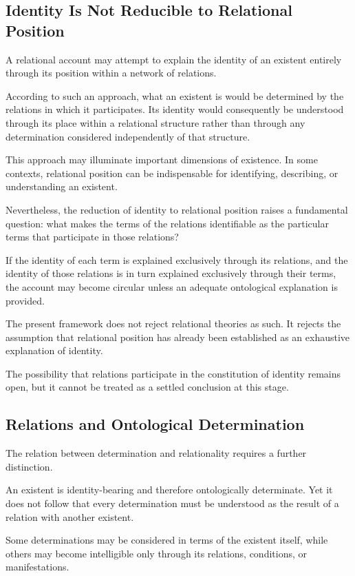 \subsection{Identity Is Not Reducible to Relational Position}

A relational account may attempt to explain the identity of an existent entirely through its position within a network of relations.

According to such an approach, what an existent is would be determined by the relations in which it participates. Its identity would consequently be understood through its place within a relational structure rather than through any determination considered independently of that structure.

This approach may illuminate important dimensions of existence. In some contexts, relational position can be indispensable for identifying, describing, or understanding an existent.

Nevertheless, the reduction of identity to relational position raises a fundamental question: what makes the terms of the relations identifiable as the particular terms that participate in those relations?

If the identity of each term is explained exclusively through its relations, and the identity of those relations is in turn explained exclusively through their terms, the account may become circular unless an adequate ontological explanation is provided.

The present framework does not reject relational theories as such. It rejects the assumption that relational position has already been established as an exhaustive explanation of identity.

The possibility that relations participate in the constitution of identity remains open, but it cannot be treated as a settled conclusion at this stage.

\subsection{Relations and Ontological Determination}

The relation between determination and relationality requires a further distinction.

An existent is identity-bearing and therefore ontologically determinate. Yet it does not follow that every determination must be understood as the result of a relation with another existent.

Some determinations may be considered in terms of the existent itself, while others may become intelligible only through its relations, conditions, or manifestations.

